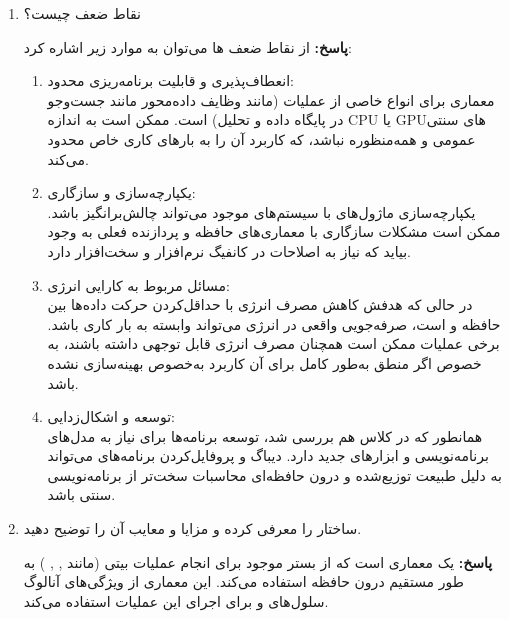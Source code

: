 \documentclass[12pt]{exam}
\begin{document}
\begin{questions}
\begin{enumerate}
	
	
	
	
	\item 
	نقاط ضعف  چیست؟
	
	\textbf{پاسخ:} از نقاط ضعف  ها می‌توان به موارد زیر اشاره کرد:
	
	
	\begin{enumerate}
		\item انعطاف‌پذیری و قابلیت برنامه‌ریزی محدود:\\
معماری  برای انواع خاصی از عملیات (مانند وظایف داده‌محور مانند جست‌وجو در پایگاه داده و تحلیل) است. ممکن است به اندازه CPU یا GPUهای سنتی عمومی و همه‌منظوره نباشد، که کاربرد آن را به بارهای کاری خاص محدود می‌کند.
		
		
		
		\item یکپارچه‌سازی و سازگاری:\\
یکپارچه‌سازی ماژول‌های  با سیستم‌های موجود می‌تواند چالش‌برانگیز باشد. ممکن است مشکلات سازگاری با معماری‌های حافظه و پردازنده فعلی به وجود بیاید که نیاز به اصلاحات در کانفیگ نرم‌افزار و سخت‌افزار دارد.
		
		
		
		\item مسائل مربوط به کارایی انرژی:\\
در حالی که  هدفش کاهش مصرف انرژی با حداقل‌کردن حرکت داده‌ها بین حافظه و  است،‌ صرفه‌جویی واقعی در انرژی می‌تواند وابسته به بار کاری باشد. برخی عملیات ممکن است همچنان مصرف انرژی قابل توجهی داشته باشند، به خصوص اگر منطق  به‌طور کامل برای آن کاربرد به‌خصوص بهینه‌سازی نشده باشد.
		
		
		
		\item توسعه و اشکال‌زدایی:\\
همانطور که در کلاس هم بررسی شد، توسعه برنامه‌ها برای  نیاز به مدل‌های برنامه‌نویسی و ابزارهای جدید دارد. دیباگ و پروفایل‌کردن برنامه‌های  می‌تواند به دلیل طبیعت توزیع‌شده و درون حافظه‌ای محاسبات سخت‌تر از برنامه‌نویسی  سنتی باشد.
		
	\end{enumerate}
	
	
	\item 
	ساختار  را معرفی کرده و مزایا و معایب آن را توضیح دهید.
	
	\textbf{پاسخ:} 
یک معماری  است که از بستر  موجود برای انجام عملیات بیتی (مانند , , ) به طور مستقیم درون حافظه استفاده می‌کند. این معماری از ویژگی‌های آنالوگ سلول‌های  و  برای اجرای این عملیات استفاده می‌کند.


\end{enumerate}
\end{questions}
\end{document}
